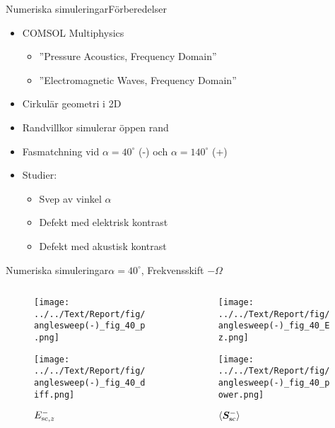 \documentclass[11pt, final]{beamer}
\begin{document}
	\begin{frame}{Numeriska simuleringar}{Förberedelser}
		\begin{itemize}
			\item COMSOL Multiphysics
			\pause
			\begin{itemize}
				\item ''Pressure Acoustics, Frequency Domain''
				\item ''Electromagnetic Waves, Frequency Domain''
			\end{itemize}
			\pause
			\item Cirkulär geometri i 2D
			\item Randvillkor simulerar öppen rand
			\pause
			\item Fasmatchning vid $\alpha = 40^\circ$ (-) och $\alpha = 140^\circ$ (+)
			\pause
			\item Studier:
			\begin{itemize}
				\item Svep av vinkel $\alpha$
				\item Defekt med elektrisk kontrast
				\item Defekt med akustisk kontrast
			\end{itemize}
		\end{itemize}
	\end{frame}
	
	\begin{frame}{Numeriska simuleringar}{$\alpha = 40^\circ$, Frekvensskift $-\Omega$}
		\begin{columns}
			\begin{column}{0.5\textwidth}
				\begin{figure}
					\centering
					\begin{overprint}
						\texttt{[image: ../../Text/Report/fig/anglesweep(-)\_fig\_40\_p.png]}
						\caption*{$p$}
						
						\texttt{[image: ../../Text/Report/fig/anglesweep(-)\_fig\_40\_diff.png]}
						\caption*{$E_{\mathrm{sc}, z}^-$}
					\end{overprint}
				\end{figure}
			\end{column}
			\begin{column}{0.5\textwidth}
				\begin{figure}
					\centering
					\begin{overprint}
						\onslide<1>
						\texttt{[image: ../../Text/Report/fig/anglesweep(-)\_fig\_40\_Ez.png]}
						\caption*{$E_{\mrm{i}, z}$}
						
						\onslide<2>
						\texttt{[image: ../../Text/Report/fig/anglesweep(-)\_fig\_40\_power.png]}
						\caption*{$\left< \bm{S}_{\mathrm{sc}}^- \right>$}
					\end{overprint}
				\end{figure}
			\end{column}
		\end{columns}
	\end{frame}
	
\end{document}

